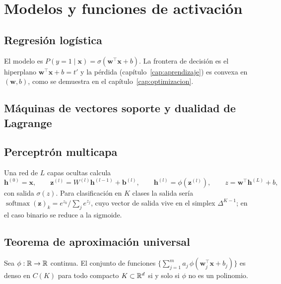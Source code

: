\chapter{Modelos y funciones de activación}
\label{cap:modelos}

\section{Regresión logística}

El modelo es $P(y=1\mid\bm x) = \sigma(\bm w^\top\bm x + b)$. La frontera de decisión es el hiperplano $\bm w^\top\bm x + b = t'$ y la pérdida (capítulo~\ref{cap:aprendizaje}) es convexa en $(\bm w, b)$, como se demuestra en el capítulo~\ref{cap:optimizacion}.

\section{Máquinas de vectores soporte y dualidad de Lagrange}


\section{Perceptrón multicapa}

Una red de $L$ capas ocultas calcula
\begin{equation}
\bm h^{(0)} = \bm x,\qquad \bm z^{(l)} = W^{(l)}\bm h^{(l-1)} + \bm b^{(l)},\qquad \bm h^{(l)} = \phi(\bm z^{(l)}),\qquad z = \bm w^\top \bm h^{(L)} + b,
\end{equation}
con salida $\sigma(z)$. Para clasificación en $K$ clases la salida sería $\operatorname{softmax}(\bm z)_k = e^{z_k}/\sum_j e^{z_j}$, cuyo vector de salida vive en el simplex $\Delta^{K-1}$; en el caso binario se reduce a la sigmoide.

\section{Teorema de aproximación universal}

\begin{teorema}
Sea $\phi:\mathbb{R}\to\mathbb{R}$ continua. El conjunto de funciones $\{\sum_{j=1}^m a_j\,\phi(\bm w_j^\top\bm x + b_j)\}$ es denso en $C(K)$ para todo compacto $K\subset\mathbb{R}^d$ si y solo si $\phi$ no es un polinomio.
\end{teorema}

